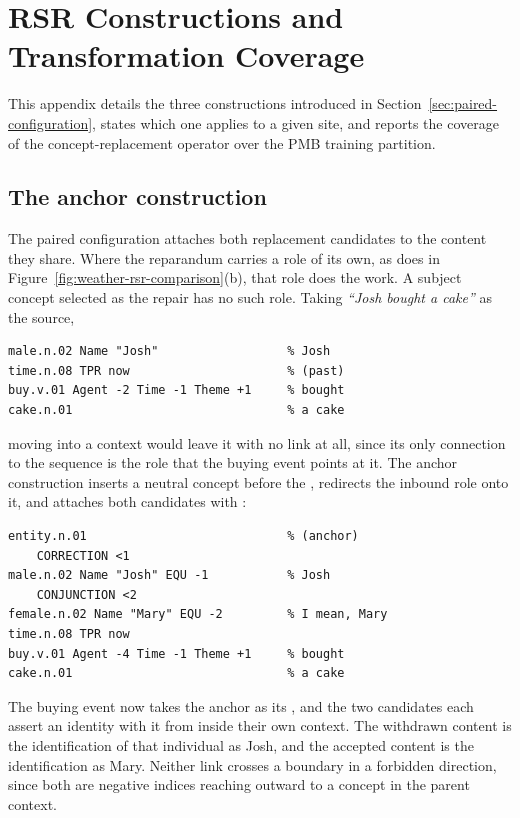 \documentclass{article}
\begin{document}
\section{RSR Constructions and Transformation Coverage}
\label{app:devices}

This appendix details the three constructions introduced in
Section~\ref{sec:paired-configuration}, states which one applies to a given
site, and reports the coverage of the concept-replacement operator over the PMB
training partition.

\subsection{The anchor construction}
\label{app:devices-anchor}

The paired configuration attaches both replacement candidates to the content
they share. Where the reparandum carries a role of its own, as
 does in Figure~\ref{fig:weather-rsr-comparison}(b), that role
does the work. A subject concept selected as the repair has no such role. Taking \textit{``Josh
bought a cake''} as the source,

\begin{lstlisting}[style=sbn]
male.n.02 Name "Josh"                  % Josh
time.n.08 TPR now                      % (past)
buy.v.01 Agent -2 Time -1 Theme +1     % bought
cake.n.01                              % a cake
\end{lstlisting}

\noindent moving  into a  context would
leave it with no link at all, since its only connection to the sequence is the
 role that the buying event points at it. The anchor construction inserts
a neutral  concept before the ,
redirects the inbound role onto it, and attaches both candidates with
:

\begin{lstlisting}[style=sbn]
entity.n.01                            % (anchor)
    CORRECTION <1
male.n.02 Name "Josh" EQU -1           % Josh
    CONJUNCTION <2
female.n.02 Name "Mary" EQU -2         % I mean, Mary
time.n.08 TPR now
buy.v.01 Agent -4 Time -1 Theme +1     % bought
cake.n.01                              % a cake
\end{lstlisting}

The buying event now takes the anchor as its , and the two
candidates each assert an identity with it from inside their own context. The
withdrawn content is the identification of that individual as Josh, and the
accepted content is the identification as Mary. Neither  link
crosses a boundary in a forbidden direction, since both are negative indices
reaching outward to a concept in the parent context.
\end{document}
